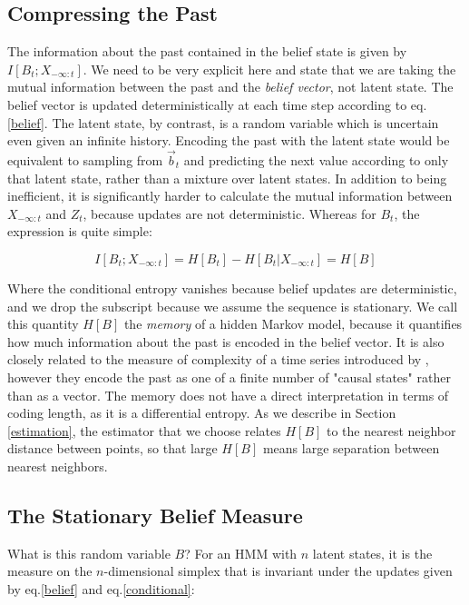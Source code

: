 \documentclass{article} %
\begin{document}
\subsection{Compressing the Past}

The information about the past contained in the belief state is given by $I[B_t;X_{-\infty:t}]$.  We need to be very explicit here and state that we are taking the mutual information between the past and the {\em belief vector}, not latent state.  The belief vector is updated deterministically at each time step according to eq.\ref{belief}.  The latent state, by contrast, is a random variable which is uncertain even given an infinite history.  Encoding the past with the latent state would be equivalent to sampling from $\vec{b}_t$ and predicting the next value according to only that latent state, rather than a mixture over latent states.  In addition to being inefficient, it is significantly harder to calculate the mutual information between $X_{-\infty:t}$ and $Z_t$, because updates are not deterministic.  Whereas for $B_t$, the expression is quite simple:

\begin{equation}
I[B_t;X_{-\infty:t}] = H[B_t] - H[B_t|X_{-\infty:t}] = H[B]
\end{equation}

Where the conditional entropy vanishes because belief updates are deterministic, and we drop the subscript because we assume the sequence is stationary.  We call this quantity $H[B]$ the {\em memory} of a hidden Markov model, because it quantifies how much information about the past is encoded in the belief vector.  It is also closely related to the measure of complexity of a time series introduced by \cite{Crutchfield1989}, however they encode the past as one of a finite number of "causal states" rather than as a vector.  The memory does not have a direct interpretation in terms of coding length, as it is a differential entropy.  As we describe in Section \ref{estimation}, the estimator that we choose relates $H[B]$ to the nearest neighbor distance between points, so that large $H[B]$ means large separation between nearest neighbors.

\subsection{The Stationary Belief Measure}

What is this random variable $B$?  For an HMM with $n$ latent states, it is the measure on the $n$-dimensional simplex that is invariant under the updates given by eq.\ref{belief} and eq.\ref{conditional}:
\end{document}
